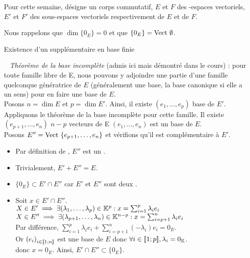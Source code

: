 \documentclass{article}
\renewenvironment{question_kholle}[2][ ]
{
	\subsection{\texorpdfstring{#2}{}}
	\notblank{#1}
	{
		\noindent #1
		\bigbreak
	}
	{}
	\begin{proof}
}
{
	\end{proof}
}
\begin{document}
	Pour cette semaine, \K désigne un corps commutatif, $E$ et $F$ des \K\!\!-espaces vectoriels, $E'$ et $F'$ des sous-espaces vectoriels respectivement de $E$ et de $F$.
	
	Nous rappelons que $\dim \{0_E\} = 0$ et que $\{0_E\} = \text{Vect } \emptyset$.
	
	\begin{question_kholle}
		{Existence d'un supplémentaire en base finie}
		
		~\newline
		\textit{Théorème de la base incomplète} (admis ici mais démontré dans le cours) : pour toute famille libre de E, nous pouvons y adjoindre une partie d'une famille quelconque génératrice de $E$ (généralement une base, la base canonique si elle a un sens) pour en faire une base de $E$. \\
		
		Posons $n = \dim E$ et $p = \dim E'$. Ainsi, il existe $(e_1, \ldots, e_p)$ base de $E'$. \\
		Appliquons le théorème de la base incomplète pour cette famille. Il existe $(e_{p+1}, \ldots, e_n)$ $n-p$ vecteurs de E \tq $(e_1, \ldots, e_n)$ est un base de $E$. \\
		Posons $E'' = \text{Vect } \{ e_{p+1}, \ldots, e_n \}$ et vérifions qu'il est complémentaire à $E'$.
		
		\begin{itemize}[label=$*$]
			\item Par définition de \Vect\!\!, $E''$ est un \sev.
			\item Trivialement, $E' + E'' = E$.
			\item $\{0_E\} \subset E' \cap E''$ car $E'$ et $E''$ sont deux \sevs.
			\item Soit $x \in E' \cap E''$. \\
			$X \in E' \implies \exists (\lambda_1, \ldots, \lambda_p) \in \mathbb K^p : x = \sum_{i=1}^{p} \lambda_i e_i$ \\
			$X \in E'' \implies \exists (\lambda_{p+1}, \ldots, \lambda_n) \in \mathbb K^{n-p} : x = \sum_{i=p+1}^{n} \lambda_i e_i$ \\
			Par différence, $\sum_{i=1}^{p} \lambda_i e_i + \sum_{i=p+1}^{n} \left(-\lambda_i\right) e_i = 0_E$. \\
			Or $\left(e_i\right)_{i \in [\![ 1 ; n ]\!]}$ est une base de $E$ donc $\forall i \in [\![ 1 ; p ]\!], \lambda_i = 0_{\mathbb K}$. \\
			donc $x = 0_E$.
			Ainsi, $E' \cap E'' \subset \{0_E\}$.
		\end{itemize}
	\end{question_kholle}
	
\end{document}
